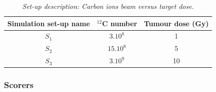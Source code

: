 \documentclass[11pt]{iopart}
\begin{document}
\begin{table}[htbp]
\begin{center}
\begin{tabular}{|c|c|c|} \hline
Simulation set-up name  & $^{12}$C number  & Tumour dose (Gy)       \\\hline \hline
 
$S_{1}$              & $3.10^{8}$             & 1                                          \\ \hline
$S_{2}$              & $15.10^{8}$                  & 5                                          \\ \hline
$S_{3}$              & $3.10^{9}$                 & 10                                      \\ \hline \hline 

\end{tabular}
\end{center} 
\caption{\it Set-up description: Carbon ions beam versus target dose.}
\label{tab:results}
\end{table}







\subsubsection{Scorers}
\end{document}
